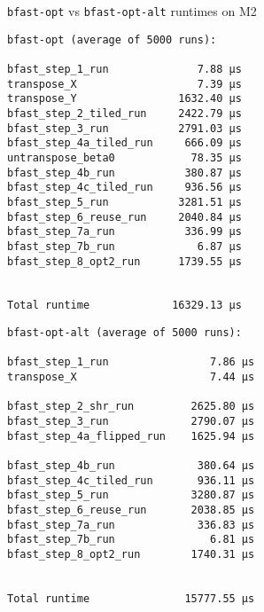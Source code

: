 \begin{frame}[fragile]{\texttt{bfast-opt} vs \texttt{bfast-opt-alt} runtimes on M2}
\begin{minipage}{.55\textwidth}
\centering
\begin{verbatim}
bfast-opt (average of 5000 runs):

bfast_step_1_run              7.88 µs
transpose_X                   7.39 µs
transpose_Y                1632.40 µs
bfast_step_2_tiled_run     2422.79 µs
bfast_step_3_run           2791.03 µs
bfast_step_4a_tiled_run     666.09 µs
untranspose_beta0            78.35 µs
bfast_step_4b_run           380.87 µs
bfast_step_4c_tiled_run     936.56 µs
bfast_step_5_run           3281.51 µs
bfast_step_6_reuse_run     2040.84 µs
bfast_step_7a_run           336.99 µs
bfast_step_7b_run             6.87 µs
bfast_step_8_opt2_run      1739.55 µs


Total runtime             16329.13 µs
\end{verbatim}
\end{minipage}%
\begin{minipage}{.5\textwidth}
\centering
\begin{verbatim}
bfast-opt-alt (average of 5000 runs):

bfast_step_1_run                7.86 µs
transpose_X                     7.44 µs

bfast_step_2_shr_run         2625.80 µs
bfast_step_3_run             2790.07 µs
bfast_step_4a_flipped_run    1625.94 µs

bfast_step_4b_run             380.64 µs
bfast_step_4c_tiled_run       936.11 µs
bfast_step_5_run             3280.87 µs
bfast_step_6_reuse_run       2038.85 µs
bfast_step_7a_run             336.83 µs
bfast_step_7b_run               6.81 µs
bfast_step_8_opt2_run        1740.31 µs


Total runtime               15777.55 µs
\end{verbatim}
\end{minipage}
\end{frame}



